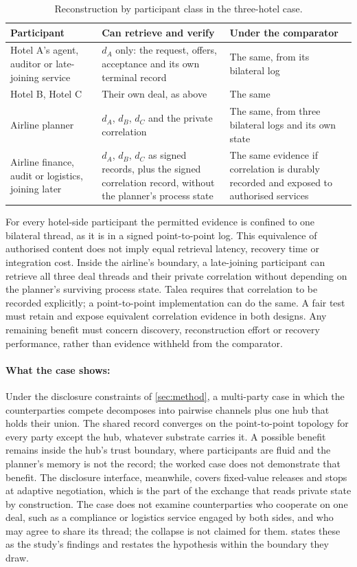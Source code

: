 \begin{table}[htbp]
\centering
\small
\caption{Reconstruction by participant class in the three-hotel case.}
\label{tab:example-multi}
\begin{tabularx}{\textwidth}{@{}P{3.6cm}LL@{}}
\toprule
Participant & Can retrieve and verify & Under the comparator \\
\midrule
Hotel A's agent, auditor or late-joining service & $d_A$ only: the request, offers, acceptance and its own terminal record & The same, from its bilateral log \\
Hotel B, Hotel C & Their own deal, as above & The same \\
Airline planner & $d_A$, $d_B$, $d_C$ and the private correlation & The same, from three bilateral logs and its own state \\
Airline finance, audit or logistics, joining later & $d_A$, $d_B$, $d_C$ as signed records, plus the signed correlation record, without the planner's process state & The same evidence if correlation is durably recorded and exposed to authorised services \\
\bottomrule
\end{tabularx}
\end{table}

For every hotel-side participant the permitted evidence is confined to one bilateral thread, as it is in a signed point-to-point log. This equivalence of authorised content does not imply equal retrieval latency, recovery time or integration cost. Inside the airline's boundary, a late-joining participant can retrieve all three deal threads and their private correlation without depending on the planner's surviving process state. Talea requires that correlation to be recorded explicitly; a point-to-point implementation can do the same. A fair test must retain and expose equivalent correlation evidence in both designs. Any remaining benefit must concern discovery, reconstruction effort or recovery performance, rather than evidence withheld from the comparator.

\paragraph{What the case shows:} Under the disclosure constraints of \cref{sec:method}, a multi-party case in which the counterparties compete decomposes into pairwise channels plus one hub that holds their union. The shared record converges on the point-to-point topology for every party except the hub, whatever substrate carries it. A possible benefit remains inside the hub's trust boundary, where participants are fluid and the planner's memory is not the record; the worked case does not demonstrate that benefit. The disclosure interface, meanwhile, covers fixed-value releases and stops at adaptive negotiation, which is the part of the exchange that reads private state by construction. The case does not examine counterparties who cooperate on one deal, such as a compliance or logistics service engaged by both sides, and who may agree to share its thread; the collapse is not claimed for them.  states these as the study's findings and restates the hypothesis within the boundary they draw.
